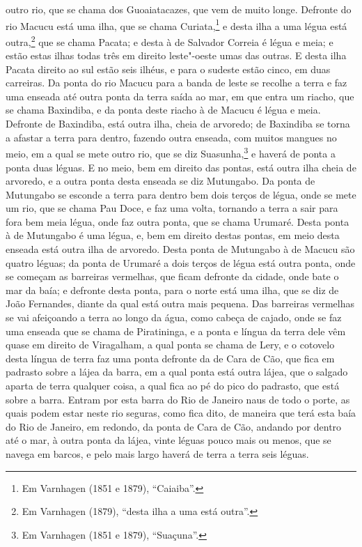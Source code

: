 \begin{linenumbers}
outro rio, que se chama dos Guoaiatacazes, que vem de muito longe. Defronte do rio Macucu
está uma ilha, que se chama Curiata,\footnote{ Em Varnhagen (1851 e 1879), ``Caiaiba''.} e
desta ilha a uma légua está outra,\footnote{ Em Varnhagen (1879), ``desta ilha a uma está
outra''.} que se chama Pacata; e desta à de Salvador Correia é légua e meia; e estão estas
ilhas todas três em direito leste"-oeste umas das outras. E desta ilha Pacata direito ao
sul estão seis ilhéus, e para o sudeste estão cinco, em duas carreiras. Da ponta do rio
Macucu para a banda de leste se recolhe a terra e faz uma enseada até outra ponta da terra
saída ao mar, em que entra um riacho, que se chama Baxindiba, e da ponta deste riacho à de
Macucu é légua e meia. Defronte de Baxindiba, está outra ilha, cheia de arvoredo; de
Baxindiba se torna a afastar a terra para dentro, fazendo outra enseada, com muitos
mangues no meio, em a qual se mete outro rio, que se diz Suasunha,\footnote{ Em Varnhagen
(1851 e 1879), ``Suaçuna''.} e haverá de ponta a ponta duas léguas. E no meio, bem em
direito das pontas, está outra ilha cheia de arvoredo, e a outra ponta desta enseada se
diz Mutungabo. Da ponta de Mutungabo se esconde a terra para dentro bem dois terços de
légua, onde se mete um rio, que se chama Pau Doce, e faz uma volta, tornando a terra a
sair para fora bem meia légua, onde faz outra ponta, que se chama Urumaré. Desta ponta à
de Mutungabo é uma légua, e, bem em direito destas pontas, em meio desta enseada está
outra ilha de arvoredo. Desta ponta de Mutungabo à de Macucu são quatro léguas; da ponta
de Urumaré a dois terços de légua está outra ponta, onde se começam as barreiras
vermelhas, que ficam defronte da cidade, onde bate o mar da baía; e defronte desta ponta,
para o norte está uma ilha, que se diz de João Fernandes, diante da qual está outra mais
pequena. Das barreiras vermelhas se vai afeiçoando a terra ao longo da água, como cabeça
de cajado, onde se faz uma enseada que se chama de Piratininga, e a ponta e língua da
terra dele vêm quase em direito de Viragalham, a qual ponta se chama de Lery, e o cotovelo
desta língua de terra faz uma ponta defronte da de Cara de Cão, que fica em padrasto sobre
a lájea da barra, em a qual ponta está outra lájea, que o salgado aparta de terra qualquer
coisa, a qual fica ao pé do pico do padrasto, que está sobre a barra. Entram por esta
barra do Rio de Janeiro naus de todo o porte, as quais podem estar neste rio seguras, como
fica dito, de maneira que terá esta baía do Rio de Janeiro, em redondo, da ponta de Cara
de Cão, andando por dentro até o mar, à outra ponta da lájea, vinte léguas pouco mais ou
menos, que se navega em barcos, e pelo mais largo haverá de terra a terra seis léguas.


\end{linenumbers}
